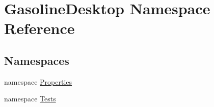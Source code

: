 \hypertarget{namespace_gasoline_desktop}{}\section{Gasoline\+Desktop Namespace Reference}
\label{namespace_gasoline_desktop}
\subsection*{Namespaces}
\begin{DoxyCompactItemize}
\item 
namespace \mbox{\hyperlink{namespace_gasoline_desktop_1_1_properties}{Properties}}
\item 
namespace \mbox{\hyperlink{namespace_gasoline_desktop_1_1_tests}{Tests}}
\end{DoxyCompactItemize}
